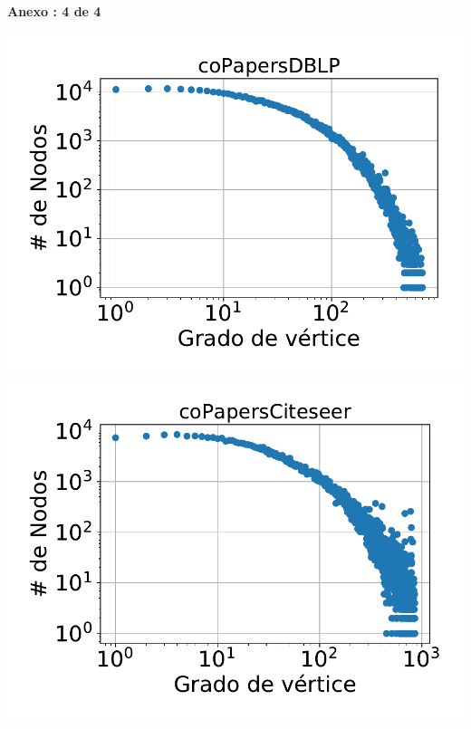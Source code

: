 \newpage
\centering
\textbf{Anexo \thechapter:  4 de 4}
\begin{minipage}{1\textwidth}
    \centering
    \includegraphics[width=.9\linewidth]{img/grades/coPapersDBLP.pdf} \\
    \includegraphics[width=.9\linewidth]{img/grades/coPapersCiteseer.pdf} \\
\end{minipage}
